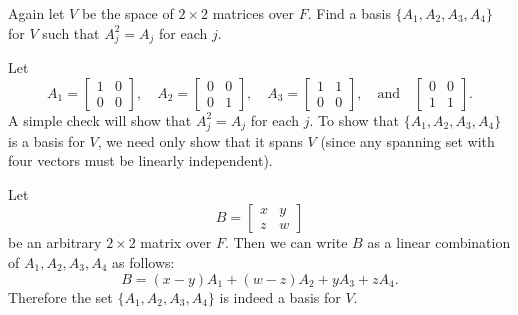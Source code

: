  Again let $V$ be the space of $2\times2$ matrices over
$F$. Find a basis $\{A_1, A_2, A_3, A_4\}$ for $V$ such that
$A_j^2 = A_j$ for each $j$.
\begin{solution}
  Let
  \begin{equation*}
    A_1 =
    \begin{bmatrix}
      1 & 0 \\ 0 & 0
    \end{bmatrix},
    \quad
    A_2 =
    \begin{bmatrix}
      0 & 0 \\ 0 & 1
    \end{bmatrix},
    \quad
    A_3 =
    \begin{bmatrix}
      1 & 1 \\ 0 & 0
    \end{bmatrix},
    \quad\text{and}\quad
    \begin{bmatrix}
      0 & 0 \\ 1 & 1
    \end{bmatrix}.
  \end{equation*}
  A simple check will show that $A_j^2 = A_j$ for each $j$. To show
  that $\{A_1, A_2, A_3, A_4\}$ is a basis for $V$, we need only show
  that it spans $V$ (since any spanning set with four vectors must be
  linearly independent).

  Let
  \begin{equation*}
    B =
    \begin{bmatrix}
      x & y \\
      z & w
    \end{bmatrix}
  \end{equation*}
  be an arbitrary $2\times2$ matrix over $F$. Then we can write $B$ as
  a linear combination of $A_1,A_2,A_3,A_4$ as follows:
  \begin{equation*}
    B = (x - y)A_1 + (w - z)A_2 + yA_3 + zA_4.
  \end{equation*}
  Therefore the set $\{A_1, A_2, A_3, A_4\}$ is indeed a basis for
  $V$.
\end{solution}

